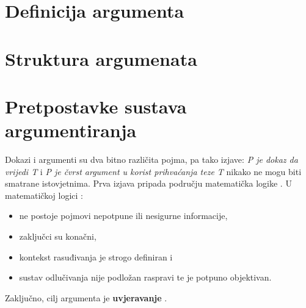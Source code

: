 
\section{Definicija argumenta}



\section{Struktura argumenata} 


\section{Pretpostavke sustava argumentiranja} Dokazi i argumenti su dva bitno
različita pojma, pa tako izjave: \emph{P je dokaz da vrijedi T} i \emph{P je
čvrst argument u korist prihvaćanja teze T} nikako ne mogu biti smatrane
istovjetnima. Prva izjava pripada području matematička logike
. U matematičkoj logici
\citep{bench2007argumentation}: \begin{itemize} \item ne postoje pojmovi
    nepotpune ili nesigurne informacije, \item zaključci su konačni, \item
    kontekst rasuđivanja je strogo definiran i \item sustav odlučivanja nije
    podložan raspravi te je potpuno objektivan.  \end{itemize} 

Zaključno, cilj argumenta je \textbf{uvjeravanje} .
